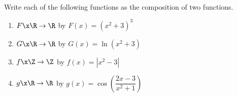 \begin{prog} \label{prog:decompose} \hfill \\
Write each of the following functions as the composition of two functions.

\begin{enumerate}
%
%
%

\item $F\x  \R \to \R$ by $F(x) = ( x^2 +3 )^3$

\item $G\x  \R \to \R$ by $G(x) = \ln ( x^2 + 3 )$

\item $f\x  \Z \to \Z$ by $f(x) = | x^2 - 3 |$

\item $g\x  \R \to \R$ by $g(x) = \cos \! \left( \dfrac{2x-3}{x^2+1} \right)$

\end{enumerate}

\end{prog}
\hbreak


\endinput

